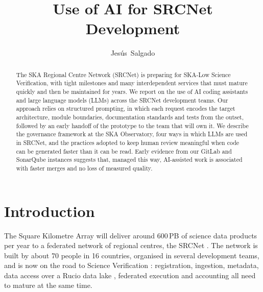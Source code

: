 \documentclass[11pt,twoside]{article}
\begin{document}
\title{Use of AI for SRCNet Development}

\author{Jes\'us~Salgado}



\begin{abstract}
The SKA Regional Centre Network (SRCNet) is preparing for SKA-Low Science
Verification, with tight milestones and many interdependent services that must
mature quickly and then be maintained for years. We report on the use of AI
coding assistants and large language models (LLMs) across the SRCNet
development teams. Our approach relies on structured prompting, in which each
request encodes the target architecture, module boundaries, documentation
standards and tests from the outset, followed by an early handoff of the
prototype to the team that will own it. We describe the governance framework
at the SKA Observatory, four ways in which LLMs are used in SRCNet, and the
practices adopted to keep human review meaningful when code can be generated
faster than it can be read. Early evidence from our GitLab and SonarQube
instances suggests that, managed this way, AI-assisted work is associated with
faster merges and no loss of measured quality.
\end{abstract}


\section{Introduction}

The Square Kilometre Array \citep{2009IEEEP..97.1482D} will deliver around
600\,PB of science data products per year to a federated network of regional
centres, the SRCNet \citep{2024ASPC..535..399S, 2025ASPC..541...64S}. The
network is built by about 70 people in 16 countries, organised in several
development teams, and is now on the road to Science Verification
\citep{2025ASPC..541..385C}: registration, ingestion, metadata, data access
over a Rucio data lake \citep{2019CSBS....3...11B}, federated execution and
accounting all need to mature at the same time.
\end{document}
